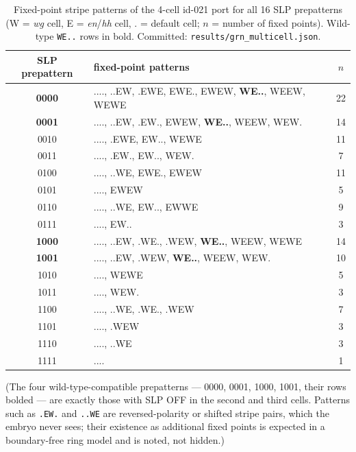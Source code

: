 \begin{table}[!htbp]
\centering
\caption{Fixed-point stripe patterns of the 4-cell id-021 port for all 16 SLP
prepatterns (W = \emph{wg} cell, E = \emph{en}/\emph{hh} cell, . = default
cell; $n$ = number of fixed points). Wild-type \texttt{WE..} rows in bold.
Committed: \texttt{results/grn\_multicell.json}.}
\label{tab:slp}
\small
\begin{tabular}{clc}
\toprule
SLP prepattern & fixed-point patterns & $n$ \\
\midrule
\textbf{0000} & ...., ..EW, .EWE, EWE., EWEW, \textbf{WE..}, WEEW, WEWE & 22 \\
\textbf{0001} & ...., ..EW, .EW., EWEW, \textbf{WE..}, WEEW, WEW. & 14 \\
0010 & ...., .EWE, EW.., WEWE & 11 \\
0011 & ...., .EW., EW.., WEW. & 7 \\
0100 & ...., ..WE, EWE., EWEW & 11 \\
0101 & ...., EWEW & 5 \\
0110 & ...., ..WE, EW.., EWWE & 9 \\
0111 & ...., EW.. & 3 \\
\textbf{1000} & ...., ..EW, .WE., .WEW, \textbf{WE..}, WEEW, WEWE & 14 \\
\textbf{1001} & ...., ..EW, .WEW, \textbf{WE..}, WEEW, WEW. & 10 \\
1010 & ...., WEWE & 5 \\
1011 & ...., WEW. & 3 \\
1100 & ...., ..WE, .WE., .WEW & 7 \\
1101 & ...., .WEW & 3 \\
1110 & ...., ..WE & 3 \\
1111 & .... & 1 \\
\bottomrule
\end{tabular}
\end{table}

(The four wild-type-compatible prepatterns --- 0000, 0001, 1000, 1001, their
rows bolded --- are exactly those with SLP OFF in the second and third
cells. Patterns such as \texttt{.EW.} and \texttt{..WE} are
reversed-polarity or shifted stripe pairs, which the embryo never sees; their
existence as additional fixed points is expected in a boundary-free ring
model and is noted, not hidden.)
